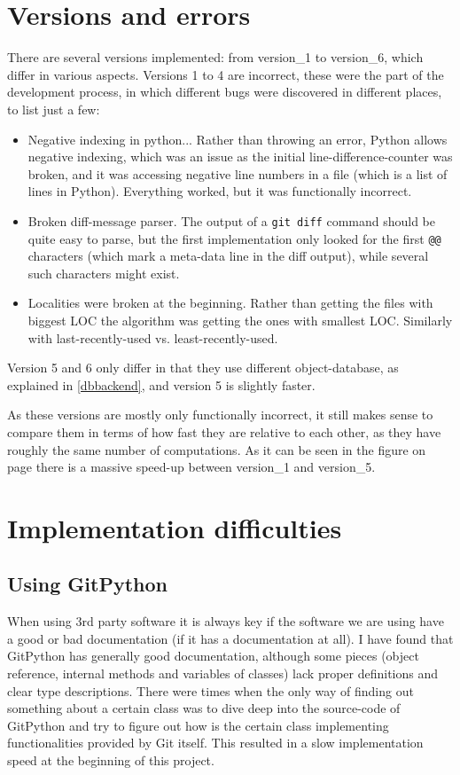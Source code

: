 \documentclass[12pt,twoside,notitlepage]{report}
\begin{document}
\section{Versions and errors}
There are several versions implemented: from version\_1 to version\_6, which differ in various aspects. Versions 1 to 4 are incorrect, these were the part of the development process, in which different bugs were discovered in different places, to list just a few:
\begin{itemize}
\item Negative indexing in python... Rather than throwing an error, Python allows negative indexing, which was an issue as the initial line-difference-counter was broken, and it was accessing negative line numbers in a file (which is a list of lines in Python). Everything worked, but it was functionally incorrect.
\item Broken diff-message parser. The output of a \texttt{git diff} command should be quite easy to parse, but the first implementation only looked for the first \texttt{@@} characters (which mark a meta-data line in the diff output), while several such characters might exist.
\item Localities were broken at the beginning. Rather than getting the files with biggest LOC the algorithm was getting the ones with smallest LOC. Similarly with last-recently-used vs. least-recently-used.
\end{itemize}
Version 5 and 6 only differ in that they use different object-database, as explained in \ref{dbbackend}, and version 5 is slightly faster.

As these versions are mostly only functionally incorrect, it still makes sense to compare them in terms of how fast they are relative to each other, as they have roughly the same number of computations. As it can be seen in the figure on page \pageref{fig:speedup} there is a massive speed-up between version\_1 and version\_5.
\section{Implementation difficulties}
\subsection{Using GitPython}
When using 3rd party software it is always key if the software we are using have a good or bad documentation (if it has a documentation at all). I have found that GitPython has generally good documentation, although some pieces (object reference, internal methods and variables of classes) lack proper definitions and clear type descriptions. There were times when the only way of finding out something about a certain class was to dive deep into the source-code of GitPython and try to figure out how is the certain class implementing functionalities provided by Git itself. This resulted in a slow implementation speed at the beginning of this project.
\end{document}

